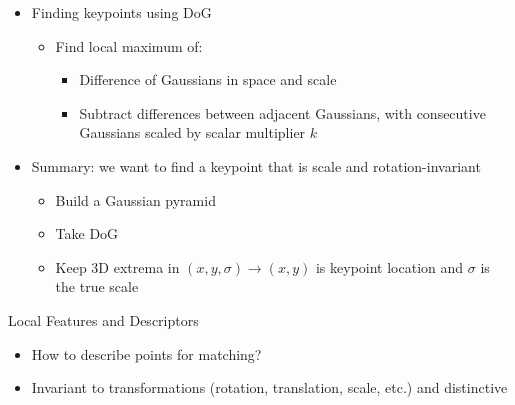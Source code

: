 \begin{itemize}
    \item Finding keypoints using DoG
    \begin{itemize}
        \item Find local maximum of:
        \begin{itemize}
            \item Difference of Gaussians in space and scale
            \item Subtract differences between adjacent Gaussians, with consecutive Gaussians scaled by scalar multiplier $k$
        \end{itemize}
    \end{itemize}
    \item Summary: we want to find a keypoint that is scale and rotation-invariant
    \begin{itemize}
        \item Build a Gaussian pyramid
        \item Take DoG
        \item Keep 3D extrema in $(x,y,\sigma)\to (x,y)$ is keypoint location and $\sigma$ is the true scale 
    \end{itemize}
\end{itemize}
Local Features and Descriptors
\begin{itemize}
    \item How to describe points for matching?
    \item Invariant to transformations (rotation, translation, scale, etc.) and distinctive
\end{itemize}
